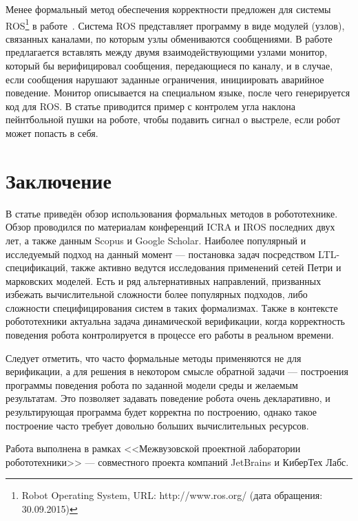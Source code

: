 \documentclass[conference]{IEEEtran}
\begin{document}
Менее формальный метод обеспечения корректности предложен для системы 
ROS\footnote{Robot Operating System, URL: http://www.ros.org/ (дата обращения: 30.09.2015)}
в работе~\cite{huang2014rosrv}. Система ROS представляет программу в виде 
модулей (узлов), связанных каналами, по которым узлы обмениваются сообщениями. 
В работе предлагается вставлять между двумя взаимодействующими узлами монитор, 
который бы верифицировал сообщения, передающиеся по каналу, и в случае, если 
сообщения нарушают заданные ограничения, инициировать аварийное поведение. 
Монитор описывается на специальном языке, после чего генерируется код для ROS. 
В статье приводится пример с контролем угла наклона пейнтбольной пушки на 
роботе, чтобы подавить сигнал о выстреле, если робот может попасть в себя.

\section{Заключение}
В статье приведён обзор использования формальных методов в робототехнике. Обзор 
проводился по материалам конференций ICRA и IROS последних двух лет, а также 
данным Scopus и Google Scholar. Наиболее популярный и исследуемый подход на 
данный момент --- постановка задач посредством LTL-спецификаций, также 
активно ведутся исследования применений сетей Петри и марковских моделей. Есть 
и ряд альтернативных направлений, призванных избежать вычислительной сложности 
более популярных подходов, либо сложности специфицирования систем в таких 
формализмах. Также в контексте робототехники актуальна задача динамической верификации, 
когда корректность поведения робота контролируется в процессе его работы в реальном времени.

Следует отметить, что часто формальные методы применяются не для верификации, 
а для решения в некотором смысле обратной задачи --- построения программы 
поведения робота по заданной модели среды и желаемым результатам. Это позволяет 
задавать поведение робота очень декларативно, и результирующая программа будет 
корректна по построению, однако такое построение часто требует довольно больших вычислительных ресурсов.

Работа выполнена в рамках <<Межвузовской проектной лаборатории робототехники>> --- совместного
проекта компаний JetBrains и КиберТех Лабс.



\end{document}
